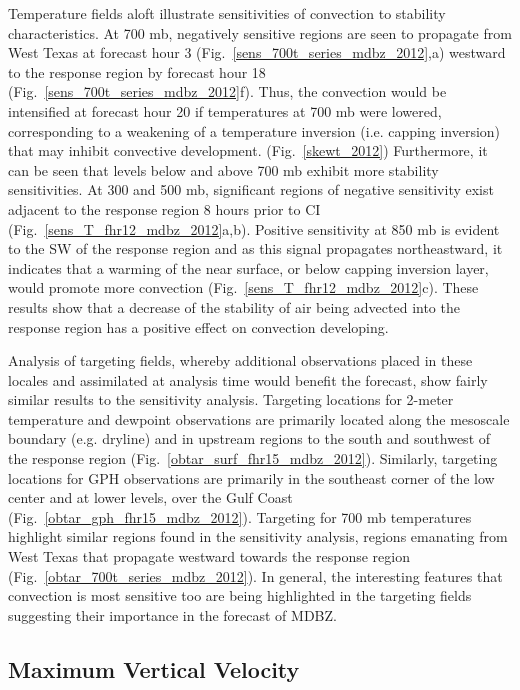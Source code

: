 \documentclass{ttuthes2007}
\newcommand{\tab}{\hspace*{2em}}  %
\begin{document}
\tab Temperature fields aloft illustrate sensitivities of convection to stability characteristics. At 700 mb, negatively sensitive regions are seen to propagate from West Texas at forecast hour 3 (Fig.~\ref{sens_700t_series_mdbz_2012},a) westward to the response region by forecast hour 18 (Fig.~\ref{sens_700t_series_mdbz_2012}f). Thus, the convection would be intensified at forecast hour 20 if temperatures at 700 mb were lowered, corresponding to a weakening of a temperature inversion (i.e. capping inversion) that may inhibit convective development. (Fig.~\ref{skewt_2012}) Furthermore, it can be seen that levels below and above 700 mb exhibit more stability sensitivities. At 300 and 500 mb, significant regions of negative sensitivity exist adjacent to the response region 8 hours prior to CI (Fig.~\ref{sens_T_fhr12_mdbz_2012}a,b). Positive sensitivity at 850 mb is evident to the SW of the response region and as this signal propagates northeastward, it indicates that a warming of the near surface, or below capping inversion layer, would promote more convection (Fig.~\ref{sens_T_fhr12_mdbz_2012}c). These results show that a decrease of the stability of air being advected into the response region has a positive effect on convection developing.  

\tab Analysis of targeting fields, whereby additional observations placed in these locales and assimilated at analysis time would benefit the forecast, show fairly similar results to the sensitivity analysis. Targeting locations for 2-meter temperature and dewpoint observations are primarily located along the mesoscale boundary (e.g. dryline) and in upstream regions to the south and southwest of the response region (Fig.~\ref{obtar_surf_fhr15_mdbz_2012}). Similarly, targeting locations for GPH observations are primarily in the southeast corner of the low center and at lower levels, over the Gulf Coast (Fig.~\ref{obtar_gph_fhr15_mdbz_2012}). Targeting for 700 mb temperatures highlight similar regions found in the sensitivity analysis, regions emanating from West Texas that propagate westward towards the response region (Fig.~\ref{obtar_700t_series_mdbz_2012}). In general, the interesting features that convection is most sensitive too are being highlighted in the targeting fields suggesting their importance in the forecast of MDBZ.

\subsection{Maximum Vertical Velocity}
\end{document}

